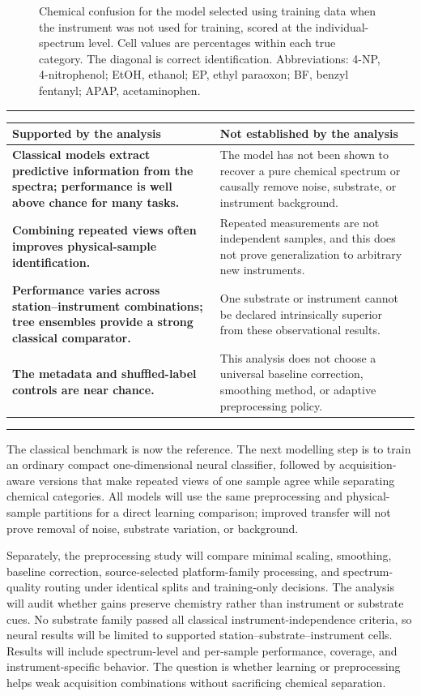 \documentclass[10pt]{article}
\newcommand{\sectiontitle}[1]{\vspace{2pt}{\large\bfseries #1}\par\vspace{1pt}\hrule\vspace{3pt}}
\begin{document}
\begin{figure}[H]
\centering

\caption{\label{fig:r4}Chemical confusion for the model selected using training data when the instrument was not used for training, scored at the individual-spectrum level. Cell values are percentages within each true category. The diagonal is correct identification. Abbreviations: 4-NP, 4-nitrophenol; EtOH, ethanol; EP, ethyl paraoxon; BF, benzyl fentanyl; APAP, acetaminophen.}
\end{figure}

\sectiontitle{7. What the analysis establishes—and what it does not}
\begin{tabularx}{\textwidth}{@{}>{\bfseries}p{}Y@{}}
\toprule
Supported by the analysis & Not established by the analysis\\
\midrule
Classical models extract predictive information from the spectra; performance is well above chance for many tasks. & The model has not been shown to recover a pure chemical spectrum or causally remove noise, substrate, or instrument background.\\
Combining repeated views often improves physical-sample identification. & Repeated measurements are not independent samples, and this does not prove generalization to arbitrary new instruments.\\
Performance varies across station--instrument combinations; tree ensembles provide a strong classical comparator. & One substrate or instrument cannot be declared intrinsically superior from these observational results.\\
The metadata and shuffled-label controls are near chance. & This analysis does not choose a universal baseline correction, smoothing method, or adaptive preprocessing policy.\\
\bottomrule
\end{tabularx}

\sectiontitle{8. Where this leaves the project}
The classical benchmark is now the reference. The next modelling step is to train an ordinary compact one-dimensional neural classifier, followed by acquisition-aware versions that make repeated views of one sample agree while separating chemical categories. All models will use the same preprocessing and physical-sample partitions for a direct learning comparison; improved transfer will not prove removal of noise, substrate variation, or background.

Separately, the preprocessing study will compare minimal scaling, smoothing, baseline correction, source-selected platform-family processing, and spectrum-quality routing under identical splits and training-only decisions. The analysis will audit whether gains preserve chemistry rather than instrument or substrate cues. No substrate family passed all classical instrument-independence criteria, so neural results will be limited to supported station--substrate--instrument cells. Results will include spectrum-level and per-sample performance, coverage, and instrument-specific behavior. The question is whether learning or preprocessing helps weak acquisition combinations without sacrificing chemical separation.
\end{document}
